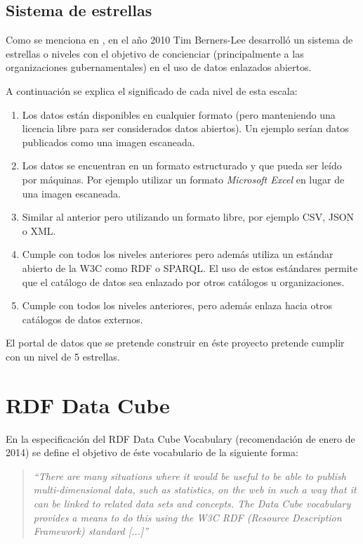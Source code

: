 \subsection{Sistema de estrellas}
Como se menciona en \cite{tbl-linkedopendata}, en el año 2010 Tim Berners-Lee desarrolló un sistema de estrellas o niveles con el objetivo de concienciar (principalmente a las organizaciones gubernamentales) en el uso de datos enlazados abiertos.

A continuación se explica el significado de cada nivel de esta escala:
\begin{enumerate}
    \item Los datos están disponibles en cualquier formato (pero manteniendo una licencia libre para ser considerados datos abiertos).  Un ejemplo serían datos publicados como una imagen escaneada.
    \item Los datos se encuentran en un formato estructurado y que pueda ser leído por máquinas.  Por ejemplo utilizar un formato \textit{Microsoft Excel} en lugar de una imagen escaneada.
    \item Similar al anterior pero utilizando un formato libre, por ejemplo CSV, JSON o XML.
    \item Cumple con todos los niveles anteriores pero además utiliza un estándar abierto de la W3C como RDF o SPARQL.  El uso de estos estándares permite que el catálogo de datos sea enlazado por otros catálogos u organizaciones.
    \item Cumple con todos los niveles anteriores, pero además enlaza hacia otros catálogos de datos externos.
\end{enumerate}

El portal de datos que se pretende construir en éste proyecto pretende cumplir con un nivel de 5 estrellas.



\section{RDF Data Cube}
\label{concept:rdf_data_cube}
En la especificación del RDF Data Cube Vocabulary (recomendación de enero de 2014) \cite{w3c:data-cube} se define el objetivo de éste vocabulario de la siguiente forma:
\begin{quote}
\textit{``There are many situations where it would be useful to be able to publish multi-dimensional data, such as statistics, on the web in such a way that it can be linked to related data sets and concepts. The Data Cube vocabulary provides a means to do this using the W3C RDF (Resource Description Framework) standard [...]''}
\end{quote}


